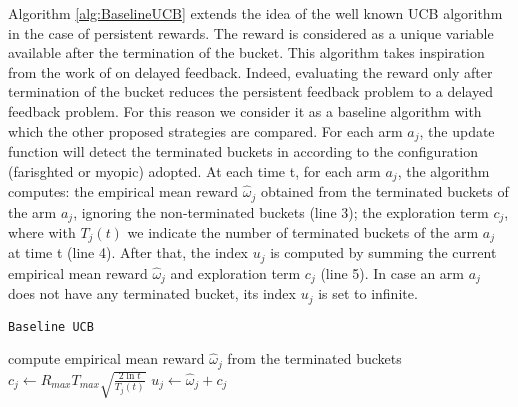 Algorithm \ref{alg:BaselineUCB} extends the idea of the well known UCB algorithm in the case of persistent rewards. The reward is considered as a unique variable available after the termination of the bucket. This algorithm takes inspiration from the work of \cite{joulani2013} on delayed feedback. Indeed, evaluating the reward only after termination of the bucket reduces the persistent feedback problem to a delayed feedback problem. For this reason we consider it as a baseline algorithm with which the other proposed strategies are compared. For each arm $a_j$, the update function will detect the terminated buckets in according to the configuration (farisghted or myopic) adopted. At each time t, for each arm $a_j$,
the algorithm computes: the empirical mean reward $\hat{\omega}_j $ obtained from the terminated buckets of the arm $a_j$, ignoring the non-terminated buckets (line 3); the exploration term $c_j$, where with ${T_j(t)}$ we indicate the number of terminated buckets of the arm $a_j$ at time t (line 4). After that, the index $u_j$ is computed by summing the current empirical mean reward $\hat{\omega}_j $ and exploration term $c_j$ (line 5). In case an arm $a_j$ does not have any terminated bucket, its index $u_j$ is set to infinite. %

\begin{algorithm}[H]
	\caption{\texttt{Baseline UCB}}
	\begin{scriptsize}
		\begin{algorithmic}[1]
			
			\State compute empirical mean reward $\hat{\omega}_j $ from the terminated buckets \;			
			\State$c_j\gets R_{max}  T_{max}  \sqrt{\frac{2\ln t}{T_j(t)}}$\;
			\State$u_j \gets  \hat{\omega}_j +  c_j$
			\EndFor
			
			\EndFunction
			
		\end{algorithmic}
	\end{scriptsize}
	\label{alg:BaselineUCB}
\end{algorithm}


